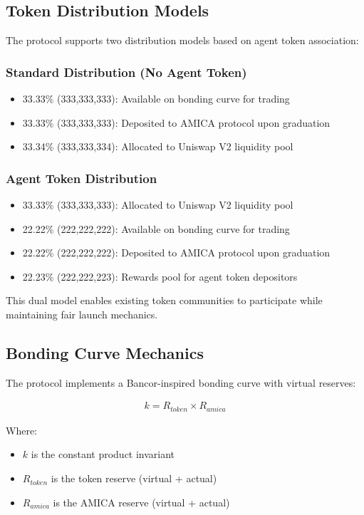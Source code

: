 \documentclass{article}
\begin{document}
\subsection{Token Distribution Models}

The protocol supports two distribution models based on agent token association:

\subsubsection{Standard Distribution (No Agent Token)}
\begin{itemize}
    \item 33.33\% (333,333,333): Available on bonding curve for trading
    \item 33.33\% (333,333,333): Deposited to AMICA protocol upon graduation
    \item 33.34\% (333,333,334): Allocated to Uniswap V2 liquidity pool
\end{itemize}

\subsubsection{Agent Token Distribution}
\begin{itemize}
    \item 33.33\% (333,333,333): Allocated to Uniswap V2 liquidity pool
    \item 22.22\% (222,222,222): Available on bonding curve for trading
    \item 22.22\% (222,222,222): Deposited to AMICA protocol upon graduation
    \item 22.23\% (222,222,223): Rewards pool for agent token depositors
\end{itemize}

This dual model enables existing token communities to participate while maintaining fair launch mechanics.

\subsection{Bonding Curve Mechanics}

The protocol implements a Bancor-inspired bonding curve with virtual reserves:

\begin{align}
k = R_{token} \times R_{amica}
\end{align}

Where:
\begin{itemize}
    \item $k$ is the constant product invariant
    \item $R_{token}$ is the token reserve (virtual + actual)
    \item $R_{amica}$ is the AMICA reserve (virtual + actual)
\end{itemize}
\end{document}
